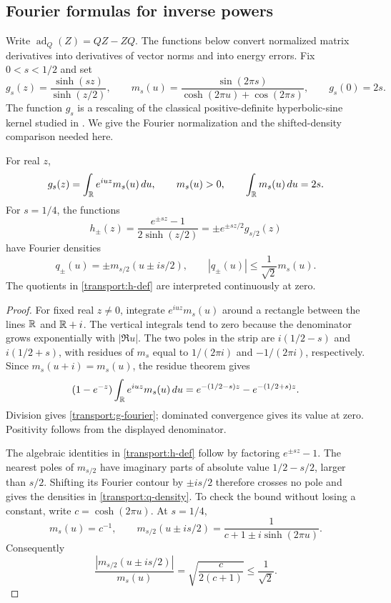 \subsection{Fourier formulas for inverse powers}

Write $\operatorname{ad}_Q(Z)=QZ-ZQ$.  The functions below convert
normalized matrix derivatives into derivatives of vector norms and into
energy errors.  Fix $0<s<1/2$ and set
\begin{equation}\label{transport:fourier-density}
 g_s(z)=\frac{\sinh(sz)}{\sinh(z/2)},\qquad
 m_s(u)=\frac{\sin(2\pi s)}{\cosh(2\pi u)+\cos(2\pi s)},
 \qquad g_s(0)=2s.
\end{equation}
The function $g_s$ is a rescaling of the classical positive-definite
hyperbolic-sine kernel studied in
\cite[Theorem~3.2]{BhatiaParthasarathy2000}.  We give the Fourier
normalization and the shifted-density comparison needed here.

\begin{lemma}\label{transport:fourier}
For real $z$,
\begin{equation}\label{transport:g-fourier}
 g_s(z)=\int_{\mathbb R}e^{iuz}m_s(u)\,du,
 \qquad m_s(u)>0,\qquad \int_{\mathbb R}m_s(u)\,du=2s.
\end{equation}
For $s=1/4$, the functions
\begin{equation}\label{transport:h-def}
 h_\pm(z)=\frac{e^{\pm sz}-1}{2\sinh(z/2)}
 =\pm e^{\pm sz/2}g_{s/2}(z)
\end{equation}
have Fourier densities
\begin{equation}\label{transport:q-density}
 q_\pm(u)=\pm m_{s/2}(u\pm is/2),\qquad
 |q_\pm(u)|\leq\frac1{\sqrt2}m_s(u).
\end{equation}
The quotients in \eqref{transport:h-def} are interpreted continuously
at zero.
\end{lemma}

\begin{proof}
For fixed real $z\ne0$, integrate $e^{iuz}m_s(u)$ around a rectangle
between the lines $\mathbb R$ and $\mathbb R+i$.  The vertical integrals tend to zero
because the denominator grows exponentially with $|\Re u|$.
The two poles in the strip are $i(1/2-s)$ and $i(1/2+s)$, with residues
of $m_s$ equal to $1/(2\pi i)$ and $-1/(2\pi i)$, respectively.
Since $m_s(u+i)=m_s(u)$, the residue theorem gives
\[
 (1-e^{-z})\int_{\mathbb R}e^{iuz}m_s(u)\,du
 =e^{-(1/2-s)z}-e^{-(1/2+s)z}.
\]
Division gives \eqref{transport:g-fourier}; dominated convergence gives
its value at zero.  Positivity follows from the displayed denominator.

The algebraic identities in \eqref{transport:h-def} follow by factoring
$e^{\pm sz}-1$.  The nearest poles of $m_{s/2}$ have imaginary parts
of absolute value $1/2-s/2$, larger than $s/2$.  Shifting its Fourier
contour by $\pm is/2$ therefore crosses no pole and gives the densities
in \eqref{transport:q-density}.  To check the bound without losing a
constant, write $c=\cosh(2\pi u)$.  At $s=1/4$,
\[
 m_s(u)=c^{-1},\qquad
 m_{s/2}(u\pm is/2)=\frac1{c+1\pm i\sinh(2\pi u)}.
\]
Consequently
\[
 \frac{|m_{s/2}(u\pm is/2)|}{m_s(u)}
 =\sqrt{\frac{c}{2(c+1)}}\leq\frac1{\sqrt2}.
\]
\end{proof}

